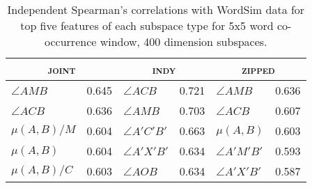 
\begin{table}
\centering
\begin{tabular}{lr|lr|lr}
\hline
\multicolumn{2}{c}{\textsc{joint}} & \multicolumn{2}{c}{\textsc{indy}} & \multicolumn{2}{c}{\textsc{zipped}} \\
\hline
$\angle AMB$ & 0.645 & $\angle ACB$ & 0.721 & $\angle AMB$ & 0.636 \\
$\angle ACB$ & 0.636 & $\angle AMB$ & 0.703 & $\angle ACB$ & 0.607 \\
$\mu (A,B)/M$ & 0.604 & $\angle A'C'B'$ & 0.663 & $\mu (A,B)$ & 0.603 \\
$\mu (A,B)$ & 0.604 & $\angle A'X'B'$ & 0.634 & $\angle A'M'B'$ & 0.593 \\
$\mu (A,B)/C$ & 0.603 & $\angle AOB$ & 0.634 & $\angle A'X'B'$ & 0.587 \\
\hline
\end{tabular}
\caption[Relatedness Correlations of Individual Features]{Independent Spearman's correlations with WordSim data for top five features of each subspace type for 5x5 word co-occurrence window, 400 dimension subspaces.}
\label{tab:ind-related}
\end{table}

